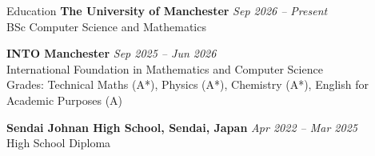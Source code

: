 \documentclass{resume} %
\begin{document}
\begin{rSection}{Education}
{\bf The University of Manchester} \hfill {\em Sep 2026 -- Present}
\\ BSc Computer Science and Mathematics

{\bf INTO Manchester} \hfill {\em Sep 2025 -- Jun 2026}
\\ International Foundation in Mathematics and Computer Science
\\ Grades: Technical Maths (A*), Physics (A*), Chemistry (A*), English for Academic Purposes (A)

{\bf Sendai Johnan High School, Sendai, Japan} \hfill {\em Apr 2022 -- Mar 2025}
\\ High School Diploma
\end{rSection}

\end{document}
